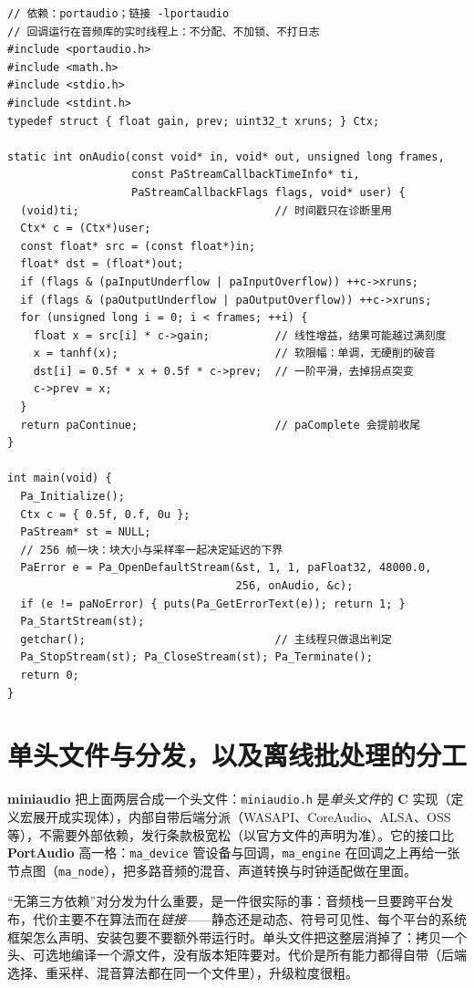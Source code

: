 \documentclass[12pt,a4paper,fontset=fandol]{ctexbook}
\newcommand{\Tp}[1]{\texttt{#1}}
\newcommand{\Lib}[1]{\textbf{#1}}
\newcommand{\Lang}[1]{\textsf{\bfseries #1}}
\newcommand{\CL}{\Lang{C}}
\begin{document}
\begin{lstlisting}[style=cstyle,label={lst:ch11-portaudio},caption={PortAudio 回调：增益加 tanh 软限幅，并把 XRUN 记成计数}]
// 依赖：portaudio；链接 -lportaudio
// 回调运行在音频库的实时线程上：不分配、不加锁、不打日志
#include <portaudio.h>
#include <math.h>
#include <stdio.h>
#include <stdint.h>
typedef struct { float gain, prev; uint32_t xruns; } Ctx;

static int onAudio(const void* in, void* out, unsigned long frames,
                   const PaStreamCallbackTimeInfo* ti,
                   PaStreamCallbackFlags flags, void* user) {
  (void)ti;                              // 时间戳只在诊断里用
  Ctx* c = (Ctx*)user;
  const float* src = (const float*)in;
  float* dst = (float*)out;
  if (flags & (paInputUnderflow | paInputOverflow)) ++c->xruns;
  if (flags & (paOutputUnderflow | paOutputOverflow)) ++c->xruns;
  for (unsigned long i = 0; i < frames; ++i) {
    float x = src[i] * c->gain;          // 线性增益，结果可能越过满刻度
    x = tanhf(x);                        // 软限幅：单调，无硬削的破音
    dst[i] = 0.5f * x + 0.5f * c->prev;  // 一阶平滑，去掉拐点突变
    c->prev = x;
  }
  return paContinue;                     // paComplete 会提前收尾
}

int main(void) {
  Pa_Initialize();
  Ctx c = { 0.5f, 0.f, 0u };
  PaStream* st = NULL;
  // 256 帧一块：块大小与采样率一起决定延迟的下界
  PaError e = Pa_OpenDefaultStream(&st, 1, 1, paFloat32, 48000.0,
                                   256, onAudio, &c);
  if (e != paNoError) { puts(Pa_GetErrorText(e)); return 1; }
  Pa_StartStream(st);
  getchar();                             // 主线程只做退出判定
  Pa_StopStream(st); Pa_CloseStream(st); Pa_Terminate();
  return 0;
}
\end{lstlisting}

\section{单头文件与分发，以及离线批处理的分工}

\Lib{miniaudio} 把上面两层合成一个头文件：\Tp{miniaudio.h} 是\emph{单头文件}的 \CL{} 实现（定义宏展开成实现体），内部自带后端分派（WASAPI、CoreAudio、ALSA、OSS 等），不需要外部依赖，发行条款极宽松（以官方文件的声明为准）。它的接口比 \Lib{PortAudio} 高一格：\Tp{ma\_device} 管设备与回调，\Tp{ma\_engine} 在回调之上再给一张节点图（\Tp{ma\_node}），把多路音频的混音、声道转换与时钟适配做在里面。

``无第三方依赖''对分发为什么重要，是一件很实际的事：音频栈一旦要跨平台发布，代价主要不在算法而在\emph{链接}——静态还是动态、符号可见性、每个平台的系统框架怎么声明、安装包要不要额外带运行时。单头文件把这整层消掉了：拷贝一个头、可选地编译一个源文件，没有版本矩阵要对。代价是所有能力都得自带（后端选择、重采样、混音算法都在同一个文件里），升级粒度很粗。
\end{document}
